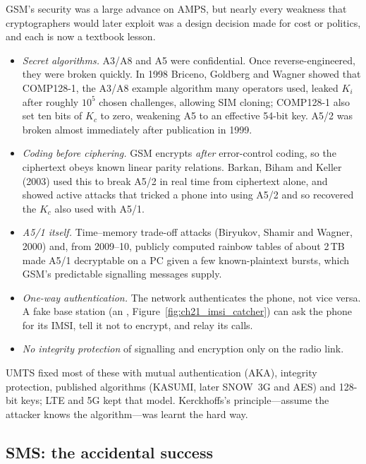 \begin{pitfall}
GSM's security was a large advance on AMPS, but nearly every weakness that cryptographers would later
exploit was a design decision made for cost or politics, and each is now a textbook lesson.
\begin{itemize}
\item \emph{Secret algorithms.} A3/A8 and A5 were confidential. Once reverse-engineered, they were
broken quickly. In 1998 Briceno, Goldberg and Wagner showed that COMP128-1, the A3/A8 example
algorithm many operators used, leaked $K_i$ after roughly $10^5$ chosen challenges, allowing SIM
cloning; COMP128-1 also set ten bits of $K_c$ to zero, weakening A5 to an effective 54-bit key. A5/2
was broken almost immediately after publication in 1999.
\item \emph{Coding before ciphering.} GSM encrypts \emph{after} error-control coding, so the
ciphertext obeys known linear parity relations. Barkan, Biham and Keller (2003) used this to break
A5/2 in real time from ciphertext alone, and showed active attacks that tricked a phone into using
A5/2 and so recovered the $K_c$ also used with A5/1.
\item \emph{A5/1 itself.} Time--memory trade-off attacks (Biryukov, Shamir and Wagner, 2000) and,
from 2009--10, publicly computed rainbow tables of about 2\,TB made A5/1 decryptable on a PC given a
few known-plaintext bursts, which GSM's predictable signalling messages supply.
\item \emph{One-way authentication.} The network authenticates the phone, not vice versa. A fake
base station (an , Figure~\ref{fig:ch21_imsi_catcher}) can ask the phone for its
IMSI, tell it not to encrypt, and relay its calls.
\item \emph{No integrity protection} of signalling and encryption only on the radio link.
\end{itemize}
UMTS fixed most of these with mutual authentication (AKA), integrity protection, published
algorithms (KASUMI, later SNOW~3G and AES) and 128-bit keys; LTE and 5G kept that model.
Kerckhoffs's principle---assume the attacker knows the algorithm---was learnt the hard way.
\end{pitfall}

\subsection{SMS: the accidental success}

